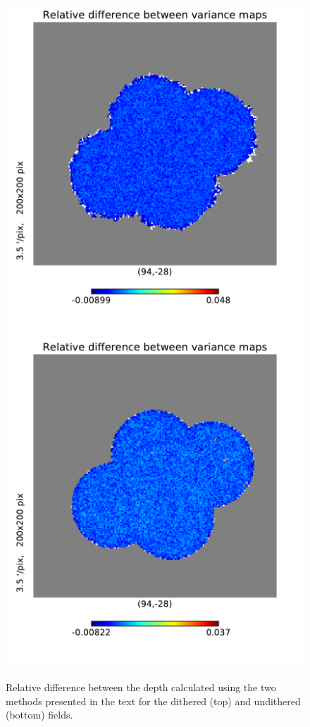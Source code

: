 \documentclass[\docopts]{\docclass}
\begin{document}
\begin{figure}
\centering
\includegraphics[width=0.9\columnwidth]{imsim_dithered_depth_difference.pdf}
\includegraphics[width=0.9\columnwidth]{imsim_undithered_depth_difference.pdf}
\caption{Relative difference between the depth calculated using the two methods presented in the text for the dithered (top) and undithered (bottom) fields.}
\label{fig:depth_comparison}
\end{figure}
\end{document}
